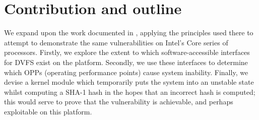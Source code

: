 \section{Contribution and outline}

We expand upon the work documented in \cite{clkscrew}, applying the principles
used there to attempt to demonstrate the same vulnerabilities on Intel's Core
series of processors. Firstly, we explore the extent to which
software-accessible interfaces for DVFS exist on the platform. Secondly, we use
these interfaces to determine which OPPs (operating performance points) cause
system inability. Finally, we devise a kernel module which temporarily puts the
system into an unstable state whilst computing a SHA-1 hash in the hopes that
an incorrect hash is computed; this would serve to prove that the \clkscrew{}
vulnerability is achievable, and perhaps exploitable on this platform.
